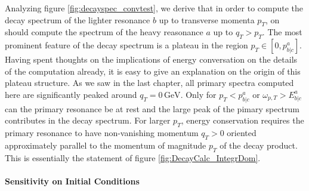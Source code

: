 {\begin{minipage}{\linewidth}
{\begin{minipage}{0.45\linewidth}
            \end{minipage}
        }
        \label{fig:decayspec_convtest}
    \end{minipage}
}
Analyzing figure \ref{fig:decayspec_convtest}, we derive that in order to compute the decay spectrum of the lighter resonance $b$ up to transverse momenta $p_T$, on should compute the spectrum of the heavy reasonance $a$ up to ${q_T>p_T}$. The most prominent feature of the decay spectrum is a plateau in the region ${p_T\in[0,p^a_{b\vert c}]}$. Having spent thoughts on the implications of energy conversation on the details of the computation already, it is easy to give an explanation on the origin of this plateau structure. As we saw in the last chapter, all primary spectra computed here are significantly peaked around ${q_T=0\,\text{GeV}}$. Only for ${p_T< p^a_{b\vert c}}$ or ${\omega_{p,T}>E^a_{b\vert c}}$ can the primary resonance be at rest and the large peak of the pimary spectrum contributes in the decay spectrum. For larger $p_T$, energy conservation requires the primary resonance to have non-vanishing momentum ${q_T>0}$ oriented approximately parallel to the momentum of magnitude ${p_T}$ of the decay product. This is essentially the statement of figure \ref{fig:DecayCalc_IntegrDom}.

\paragraph{Sensitivity on Initial Conditions}

